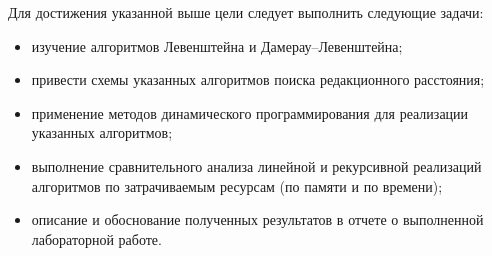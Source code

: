 Для достижения указанной выше цели следует выполнить следующие задачи:
\begin{itemize}
	\item изучение алгоритмов Левенштейна и Дамерау--Левенштейна;
	\item привести схемы указанных алгоритмов поиска редакционного расстояния;
	\item применение методов динамического программирования для реализации указанных алгоритмов;
	\item выполнение сравнительного анализа линейной и рекурсивной реализаций алгоритмов по затрачиваемым ресурсам (по памяти и по времени);
	\item описание и обоснование полученных результатов в отчете о выполненной лабораторной работе.
\end{itemize}
